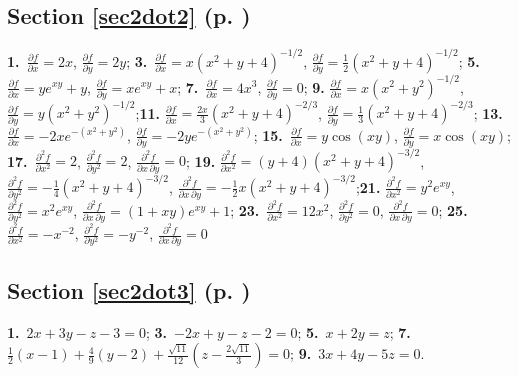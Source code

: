 \begin{multicols}{2}
\subsection*{Section \ref{sec2dot2} (p. \pageref{sec2dot2})}
\textbf{1.}~$\frac{\partial f}{\partial x} = 2x$, $\frac{\partial f}{\partial y} = 2y$;\quad
\textbf{3.}~$\frac{\partial f}{\partial x} = x(x^2 + y + 4)^{-1/2}$,
$\frac{\partial f}{\partial y} = \frac{1}{2}(x^2 + y + 4)^{-1/2}$;\quad
\textbf{5.}~$\frac{\partial f}{\partial x} = ye^{xy} + y$, $\frac{\partial f}{\partial y} = xe^{xy} + x$;\quad
\textbf{7.}~$\frac{\partial f}{\partial x} = 4x^3$, $\frac{\partial f}{\partial y} = 0$;\quad
\textbf{9.}
$\frac{\partial f}{\partial x}=x(x^2 + y^2 )^{-1/2}$, $\frac{\partial f}{\partial y}=y(x^2 + y^2 )^{-1/2}$;\quad\textbf{11.}
$\frac{\partial f}{\partial x} = \frac{2x}{3}(x^2 + y + 4)^{-2/3}$,
$\frac{\partial f}{\partial y} = \frac{1}{3}(x^2 + y + 4)^{-2/3}$;\quad
\textbf{13.}
$\frac{\partial f}{\partial x}=-2xe^{-(x^2 + y^2 )}$, $\frac{\partial f}{\partial y}=-2ye^{-(x^2 + y^2 )}$;\quad
\textbf{15.}~$\frac{\partial f}{\partial x} = y\cos(xy)$, $\frac{\partial f}{\partial y} = x\cos(xy)$;\quad
\textbf{17.}~$\frac{\partial^2 f}{\partial x^2} =2$,
$\frac{\partial^2 f}{\partial y^2} = 2$,
$\frac{\partial^2 f}{\partial x \,\partial y} = 0$;\quad
\textbf{19.}
$\frac{\partial^2 f}{\partial x^2} = (y+4)(x^2 + y+4)^{-3/2}$, 
$\frac{\partial^2 f}{\partial y^2} = -\frac{1}{4}(x^2 + y+4)^{-3/2}$, 
$\frac{\partial^2 f}{\partial x \,\partial y} = -\frac{1}{2}x(x^2 + y+4)^{-3/2}$;\quad\textbf{21.}
$\frac{\partial^2 f}{\partial x^2} = y^2 e^{xy}$,
$\frac{\partial^2 f}{\partial y^2} = x^2 e^{xy}$,
$\frac{\partial^2 f}{\partial x \,\partial y} = (1+xy)e^{xy} + 1$;\quad
\textbf{23.}~$\frac{\partial^2 f}{\partial x^2} =12x^2$,
$\frac{\partial^2 f}{\partial y^2} = 0$,
$\frac{\partial^2 f}{\partial x \,\partial y} = 0$;\quad
\textbf{25.}~$\frac{\partial^2 f}{\partial x^2} =-x^{-2}$,
$\frac{\partial^2 f}{\partial y^2} = -y^{-2}$,
$\frac{\partial^2 f}{\partial x \,\partial y} = 0$

\subsection*{Section \ref{sec2dot3} (p. \pageref{sec2dot3})}

\textbf{1.}~$2x+3y-z-3=0$;\quad
\textbf{3.}~$-2x+y-z-2=0$;\quad
\textbf{5.}~$x+2y=z$;\quad
\textbf{7.}~$\frac{1}{2}(x-1)+\frac{4}{9}(y-2)+\frac{\sqrt{11}}{12}(z-\frac{2\sqrt{11}}{3})=0$;\quad
\textbf{9.}~$3x+4y-5z=0$.


\end{multicols}
